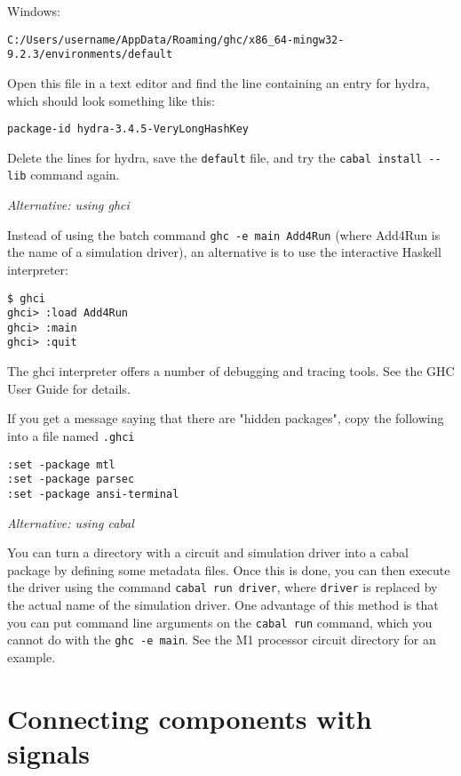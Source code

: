 \documentclass[11pt]{article}
\begin{document}
Windows:
\begin{verbatim}
C:/Users/username/AppData/Roaming/ghc/x86_64-mingw32-9.2.3/environments/default
\end{verbatim}

Open this file in a text editor and find the line containing an entry
for hydra, which should look something like this:

\begin{verbatim}
package-id hydra-3.4.5-VeryLongHashKey
\end{verbatim}

Delete the lines for hydra, save the \texttt{default} file, and try the
\texttt{cabal install -{}-{}lib} command again.

\emph{Alternative: using ghci}

Instead of using the batch command \texttt{ghc -e main Add4Run} (where
Add4Run is the name of a simulation driver), an alternative is to use
the interactive Haskell interpreter:

\begin{verbatim}
$ ghci
ghci> :load Add4Run
ghci> :main
ghci> :quit
\end{verbatim}

The ghci interpreter offers a number of debugging and tracing tools.
See the GHC User Guide for details.

If you get a message saying that there are "hidden packages", copy the
following into a file named \texttt{.ghci}
\begin{verbatim}
:set -package mtl
:set -package parsec
:set -package ansi-terminal
\end{verbatim}

\emph{Alternative: using cabal}

You can turn a directory with a circuit and simulation driver into a
cabal package by defining some metadata files.  Once this is done, you
can then execute the driver using the command \texttt{cabal run driver},
where \texttt{driver} is replaced by the actual name of the simulation
driver.  One advantage of this method is that you can put command line
arguments on the \texttt{cabal run} command, which you cannot do with the
\texttt{ghc -e main}.  See the M1 processor circuit directory for an example.


\section{Connecting components with signals}
\label{sec:orge8d41eb}
\end{document}
